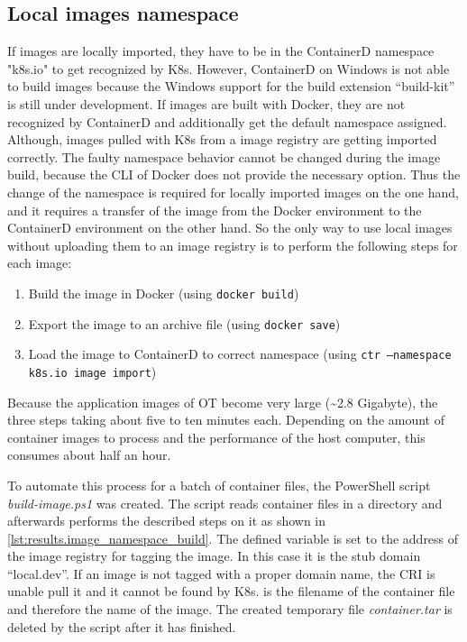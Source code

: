 \subsection{Local images namespace}
If images are locally imported, they have to be in the ContainerD namespace "k8s.io" to get recognized by \ac{K8s}. However, ContainerD on \ac{Windows} is not able to build images because the \ac{Windows} support for the build extension \enquote{build-kit} is still under development\cite{Microsoft.20221225}. If images are built with Docker, they are not recognized by ContainerD and additionally get the default namespace assigned. Although, images pulled with \ac{K8s} from a image registry are getting imported correctly. The faulty namespace behavior cannot be changed during the image build, because the \ac{CLI} of Docker does not provide the necessary option. Thus the change of the namespace is required for locally imported images on the one hand, and it requires a transfer of the image from the Docker environment to the ContainerD environment on the other hand.
So the only way to use local images without uploading them to an image registry is to perform the following steps for each image:
\begin{enumerate}
	\item Build the image in Docker (using \texttt{docker build})
	\item Export the image to an archive file (using \texttt{docker save})
	\item Load the image to ContainerD to correct namespace (using \texttt{ctr --namespace k8s.io image import})
\end{enumerate}
Because the application images of \ac{OT} become very large (\~{}2.8 Gigabyte), the three steps taking about five to ten minutes each. Depending on the amount of container images to process and the performance of the host computer, this consumes about half an hour.

To automate this process for a batch of container files, the PowerShell script \textit{build-image.ps1} was created. The script reads container files in a directory and afterwards performs the described steps on it as shown in \autoref{lst:results.image_namespace_build}.
The defined variable  is set to the address of the image registry for tagging the image. In this case it is the stub domain \enquote{local.dev}. If an image is not tagged with a proper domain name, the \ac{CRI} is unable pull it and it cannot be found by \ac{K8s}.
 is the filename of the container file and therefore the name of the image. The created temporary file \textit{container.tar} is deleted by the script after it has finished.

